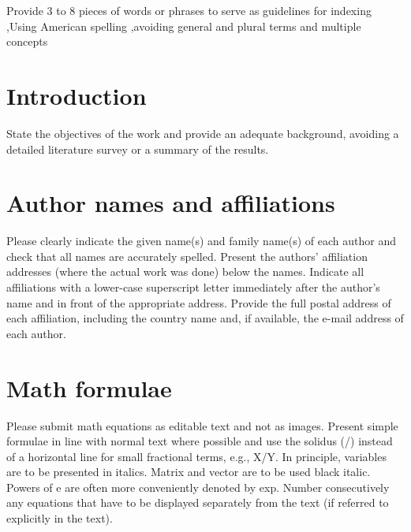 \documentclass[twocolumn,3p,times,procedia]{elsarticle}
\begin{document}
\begin{frontmatter}
\begin{abstract}
\end{abstract}



\begin{keyword}


Provide 3 to 8 pieces of words or phrases to serve as guidelines for indexing \sep Using American spelling \sep  avoiding general and plural terms and multiple concepts



\end{keyword}



\end{frontmatter}


\section{Introduction}
State the objectives of the work and provide an adequate background, avoiding a detailed literature survey or a summary of the results.


\section{Author names and affiliations}
Please clearly indicate the given name(s) and family name(s) of each author and check that all names are accurately spelled. Present the authors' affiliation addresses (where the actual work was done) below the names. Indicate all affiliations with a lower-case superscript letter immediately after the author's name and in front of the appropriate address. Provide the full postal address of each affiliation, including the country name and, if available, the e-mail address of each author.

\section{Math formulae}
Please submit math equations as editable text and not as images. Present simple formulae in line with normal text where possible and use the solidus (/) instead of a horizontal line for small fractional terms, e.g., X/Y. In principle, variables are to be presented in italics. Matrix and vector are to be used black italic. Powers of e are often more conveniently denoted by exp. Number consecutively any equations that have to be displayed separately from the text (if referred to explicitly in the text).
\end{document}

